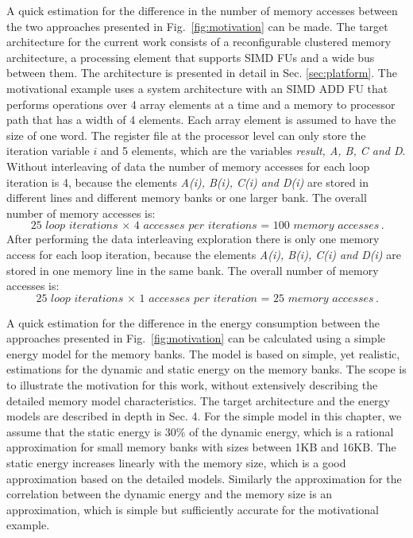 \documentclass[prodmode,acmtecs]{acmsmall}
\begin{document}
A quick estimation for the difference in the number of memory accesses between the two approaches presented in Fig.~\ref{fig:motivation} can be made.
The target architecture for the current work consists of a reconfigurable clustered memory architecture, a processing element that supports SIMD FUs and a wide bus between them.
The architecture is presented in detail in Sec. \ref{sec:platform}.
The motivational example uses a system architecture with an SIMD ADD FU that performs operations over 4 array elements at a time and a memory to processor path that has a width of 4 elements. 
Each array element is assumed to have the size of one word.
The register file at the processor level can only store the iteration variable $i$ and 5 elements, which are the variables \textit{result, A, B, C and D}.
Without interleaving of data the number of memory accesses for each loop iteration is 4, because the elements \textit{A(i), B(i), C(i) and D(i)} are stored in different lines and different memory banks or one larger bank.
The overall number of memory accesses is:
	\begin{equation}
		\textit{25 loop iterations $\times$ 4 accesses per iterations = 100 memory accesses}.
	\end{equation}	 
After performing the data interleaving exploration there is only one memory access for each loop iteration, because the elements \textit{A(i), B(i), C(i) and D(i)} are stored in one memory line in the same bank.
The overall number of memory accesses is:
	\begin{equation}
		\textit{25 loop iterations $\times$ 1 accesses per iteration = 25 memory accesses}.
	\end{equation}	 	

A quick estimation for the difference in the energy consumption between the approaches presented in Fig.~\ref{fig:motivation} can be calculated using a simple energy model for the memory banks.
The model is based on simple, yet realistic, estimations for the dynamic and static energy on the memory banks.
The scope is to illustrate the motivation for this work, without extensively describing the detailed memory model characteristics. 
The target architecture and the energy models are described in depth in Sec. 4. 
For the simple model in this chapter, we assume that the static energy is 30\% of the dynamic energy, which is a rational approximation for small memory banks with sizes between 1KB and 16KB.
The static energy increases linearly with the memory size, which is a good approximation based on the detailed models.
Similarly the approximation for the correlation between the dynamic energy and the memory size is an approximation, which is simple but sufficiently accurate for the motivational example.
\end{document}

